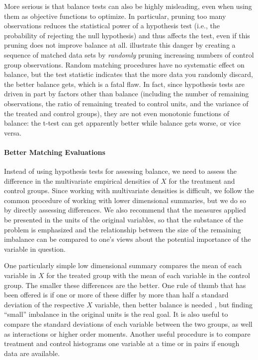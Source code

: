 \documentclass[11pt,titlepage]{article}
\begin{document}
More serious is that balance tests can also be highly misleading, even
when using them as objective functions to optimize.  In particular,
pruning too many observations reduces the statistical power of a
hypothesis test (i.e., the probability of rejecting the null
hypothesis) and thus affects the test, even if this pruning does not
improve balance at all.  \citet{ImaKinStu05} illustrate this danger by
creating a sequence of matched data sets by \emph{randomly} pruning
increasing numbers of control group observations.  Random matching
procedures have no systematic effect on balance, but the test
statistic indicates that the more data you randomly discard, the
better balance gets, which is a fatal flaw.  In fact, since hypothesis
tests are driven in part by factors other than balance (including the
number of remaining observations, the ratio of remaining treated to
control units, and the variance of the treated and control groups),
they are not even monotonic functions of balance: the t-test can get
apparently better while balance gets worse, or vice versa.

\paragraph{Better Matching Evaluations}

Instead of using hypothesis tests for assessing balance, we need to
assess the difference in the multivariate empirical densities of $X$
for the treatment and control groups.  Since working with multivariate
densities is difficult, we follow the common procedure of working with
lower dimensional summaries, but we do so by directly assessing
differences.  We also recommend that the measures applied be presented
in the units of the original variables, so that the substance of the
problem is emphasized and the relationship between the size of the
remaining imbalance can be compared to one's views about the potential
importance of the variable in question.

One particularly simple low dimensional summary compares the mean of
each variable in $X$ for the treated group with the mean of each
variable in the control group.  The smaller these differences are the
better.  One rule of thumb that has been offered is if one or more of
these differ by more than half a standard deviation of the respective
$X$ variable, then better balance is needed \citep{Cochran68}, but
finding ``small'' imbalance in the original units is the real goal.
It is also useful to compare the standard deviations of each variable
between the two groups, as well as interactions or higher order
moments.  Another useful procedure is to compare treatment and control
histograms one variable at a time or in pairs if enough data are
available.
\end{document}
